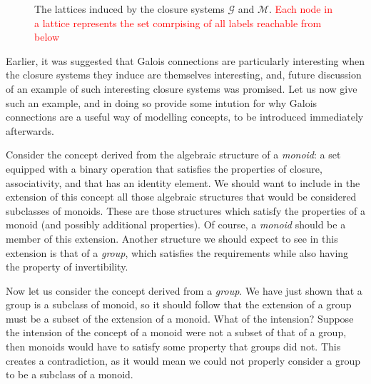 \begin{figure}[H]
	\vspace{-6em}
	\caption{The lattices induced by the closure systems $\mathcal{G}$ and $\mathcal{M}$. \textcolor{red}{Each node in a
	lattice represents the set comrpising of all labels reachable from below}}
	\label{figure:two-lattices}
\end{figure}

Earlier, it was suggested that Galois connections are particularly interesting when the closure systems they induce are
themselves interesting, and, future discussion of an example of such interesting closure systems was promised. Let us now
give such an example, and in doing so provide some intution for why Galois connections are a useful way of modelling
concepts, to be introduced immediately afterwards.

Consider the concept derived from the algebraic structure of a \textit{monoid}: a set equipped with a binary operation that
satisfies the properties of closure, associativity, and that has an identity element. We should want to include in the
extension of this concept all those algebraic structures that would be considered subclasses of monoids. These are those
structures which satisfy the properties of a monoid (and possibly additional properties). Of course, a \textit{monoid}
should be a member of this extension. Another structure we should expect to see in this extension is that of a \textit{group},
which satisfies the requirements while also having the property of invertibility.

Now let us consider the concept derived from a \textit{group}. We have just shown that a group is a subclass of monoid,
so it should follow that the extension of a group must be a subset of the extension of a monoid. What of the intension?
Suppose the intension of the concept of a monoid were not a subset of that of a group, then monoids would have to satisfy
some property that groups did not. This creates a contradiction, as it would mean we could not properly consider a group
to be a subclass of a monoid.

